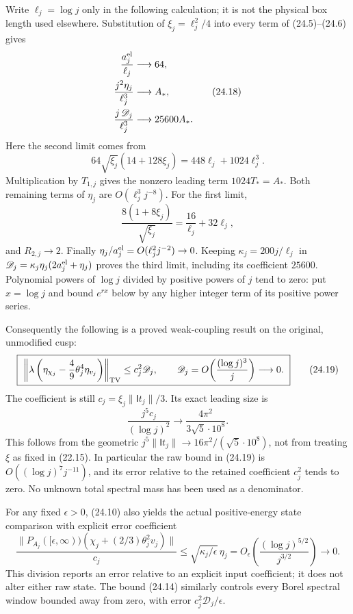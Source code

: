 \documentclass[
]{article}
\begin{document}
Write \(\ell_j=\log j\) only in the following calculation; it is not the
physical box length used elsewhere. Substitution of \(\xi_j=\ell_j^2/4\)
into every term of (24.5)--(24.6) gives \[
\begin{aligned}
\frac{a_j^{\rm el}}{\ell_j}&\longrightarrow64,\\
\frac{j^2\eta_j}{\ell_j^3}&\longrightarrow A_*,\\
\frac{j\,\mathscr D_j}{\ell_j^3}
 &\longrightarrow25600A_* .
\end{aligned}\tag{24.18}
\] Here the second limit comes from \[
64\sqrt{\xi_j}(14+128\xi_j)
       =448\ell_j+1024\ell_j^3.
\] Multiplication by \(T_{1,j}\) gives the nonzero leading term
\(1024T_*=A_*\). Both remaining terms of \(\eta_j\) are
\(O(\ell_j^3j^{-8})\). For the first limit, \[
\frac{8(1+8\xi_j)}{\sqrt{\xi_j}}
 =\frac{16}{\ell_j}+32\ell_j ,
\] and \(R_{2,j}\to2\). Finally
\(\eta_j/a_j^{\rm el}=O(\ell_j^2j^{-2})\to0\). Keeping
\(\kappa_j=200j/\ell_j\) in
\(\mathscr D_j=\kappa_j\eta_j(2a_j^{\rm el}+\eta_j)\) proves the third
limit, including its coefficient \(25600\). Polynomial powers of
\(\log j\) divided by positive powers of \(j\) tend to zero: put
\(x=\log j\) and bound \(e^{rx}\) below by any higher integer term of
its positive power series.

Consequently the following is a proved weak-coupling result on the
original, unmodified cusp: \[
\boxed{\ 
\left\|\lambda\left(
\eta_{\chi_j}-\frac49\theta_j^4\eta_{v_j}\right)\right\|_{\rm TV}
\le c_j^2\mathscr D_j,\qquad
\mathscr D_j=O\!\left(\frac{(\log j)^3}{j}\right)\longrightarrow0 .
\ }\tag{24.19}
\] The coefficient is still \(c_j=\xi_j\|\mathsf It_j\|/3\). Its exact
leading size is \[
\frac{j^5c_j}{(\log j)^2}
 \longrightarrow\frac{4\pi^2}{3\sqrt5\cdot10^8}.
\tag{24.20}
\] This follows from the geometric
\(j^5\|\mathsf It_j\|\to16\pi^2/(\sqrt5\cdot10^8)\), not from treating
\(\xi\) as fixed in (22.15). In particular the raw bound in (24.19) is
\(O((\log j)^7j^{-11})\), and its error relative to the retained
coefficient \(c_j^2\) tends to zero. No unknown total spectral mass has
been used as a denominator.

For any fixed \(\epsilon>0\), (24.10) also yields the actual
positive-energy state comparison with explicit error coefficient \[
\frac{\|P_{A_j}([\epsilon,\infty))
          (\chi_j+(2/3)\theta_j^2v_j)\|}{c_j}
\le\sqrt{\kappa_j/\epsilon}\,\eta_j
=O_\epsilon\!\left(\frac{(\log j)^{5/2}}{j^{3/2}}\right)
\longrightarrow0 .
\tag{24.21}
\] This division reports an error relative to an explicit input
coefficient; it does not alter either raw state. The bound (24.14)
similarly controls every Borel spectral window bounded away from zero,
with error \(c_j^2\mathscr D_j/\epsilon\).
\end{document}
